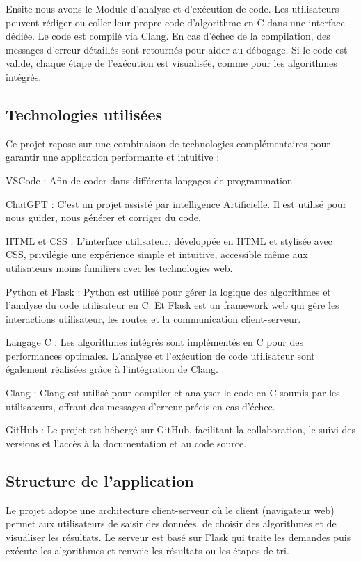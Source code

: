 \documentclass[a4paper, 12pt, twoside]{article}
\begin{document}
Ensite nous avons le Module d’analyse et d’exécution de code. 
Les utilisateurs peuvent rédiger ou coller leur propre code d’algorithme en C dans une interface dédiée.
Le code est compilé via Clang. En cas d’échec de la compilation, des messages d’erreur détaillés sont retournés pour aider au débogage.
Si le code est valide, chaque étape de l’exécution est visualisée, comme pour les algorithmes intégrés.
\vspace{30pt}
\subsection{Technologies utilisées}
Ce projet repose sur une combinaison de technologies complémentaires pour garantir une application performante et intuitive : 
\newline

VSCode : Afin de coder dans différents langages de programmation.
\newline

ChatGPT : C'est un projet assisté par intelligence Artificielle. Il est utilisé pour nous guider, nous générer et corriger du code.
\newline

HTML et CSS : L’interface utilisateur, développée en HTML et stylisée avec CSS, privilégie une expérience simple et intuitive, accessible même aux utilisateurs moins familiers avec les technologies web.
\newline

Python et Flask : Python est utilisé pour gérer la logique des algorithmes et l’analyse du code utilisateur en C.
Et Flask est un framework web qui gère les interactions utilisateur, les routes et la communication client-serveur.
\newline

Langage C : Les algorithmes intégrés sont implémentés en C pour des performances optimales.
L’analyse et l’exécution de code utilisateur sont également réalisées grâce à l’intégration de Clang.
\newline

Clang : Clang est utilisé pour compiler et analyser le code en C soumis par les utilisateurs, offrant des messages d’erreur précis en cas d’échec.
\newline

GitHub : Le projet est hébergé sur GitHub, facilitant la collaboration, le suivi des versions et l’accès à la documentation et au code source.
\vspace{30pt}
\subsection{Structure de l’application}
Le projet adopte une architecture client-serveur où le client (navigateur web) permet aux utilisateurs de saisir des données, de choisir des algorithmes et de visualiser les résultats.
Le serveur est basé sur Flask qui traite les demandes puis exécute les algorithmes et renvoie les résultats ou les étapes de tri.
\newline
\end{document}
